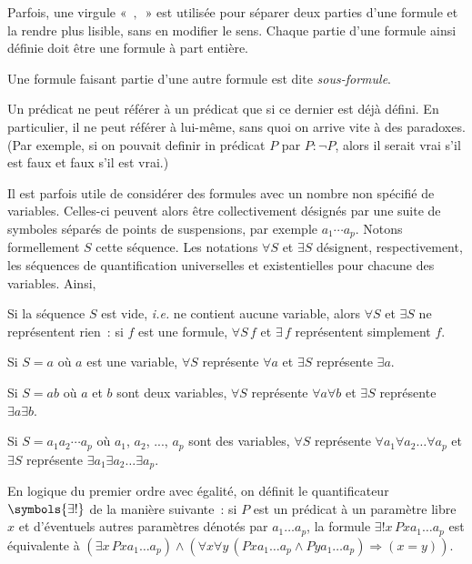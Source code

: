 Parfois, une virgule « $,$ » est utilisée pour séparer deux parties d'une formule et la rendre plus lisible, sans en modifier le sens. 
Chaque partie d'une formule ainsi définie doit être une formule à part entière. 

Une formule faisant partie d'une autre formule est dite \emph{sous-formule}.

\blank[medium]

\noindent{} Un prédicat ne peut référer à un prédicat que si ce dernier est déjà défini. En particulier, il ne peut référer à lui-même, sans quoi on arrive vite à des paradoxes. (Par exemple, si on pouvait definir in prédicat $P$ par $P: \lnot P$, alors il serait vrai s'il est faux et faux s'il est vrai.)

\stopsubsection


\startsubsection[title=Formule à nombre non spécifié de paramètres]

Il est parfois utile de considérer des formules avec un nombre non spécifié de variables. 
Celles-ci peuvent alors être collectivement désignés par une suite de symboles séparés de points de suspensions, par exemple $a_1 \cdots a_p$. 
Notons formellement $S$ cette séquence.
Les notations $\forall S$ et $\exists S$ désignent, respectivement, les séquences de quantification universelles et existentielles pour chacune des variables. 
Ainsi, 
\startitemize[mowhite]
  \item Si la séquence $S$ est vide, \emph{i.e.} ne contient aucune variable, alors $\forall S$ et $\exists S$ ne représentent rien : si $f$ est une formule, $\forall S \, f$ et $\exists \, f$ représentent simplement $f$.
  \item Si $S = a$ où $a$ est une variable, $\forall S$ représente $\forall a$ et $\exists S$ représente $\exists a$. 
  \item Si $S = a b$ où $a$ et $b$ sont deux variables, $\forall S$ représente $\forall a \forall b$ et $\exists S$ représente $\exists a \exists b$. 
  \item Si $S = a_1 a_2 \cdots a_p$ où $a_1$, $a_2$, ..., $a_p$ sont des variables, $\forall S$ représente $\forall a_1 \forall a_2 \dots \forall a_p$ et $\exists S$ représente $\exists a_1 \exists a_2 \dots \exists a_p$. 
\stopitemize

\stopsubsection


\startsubsection[title=Quantificateur d'unicité]

En logique du premier ordre avec égalité, on définit le quantificateur $\symbols{\exists !}$ de la manière suivante : si $P$ est un prédicat à un paramètre libre $x$ et d'éventuels autres paramètres dénotés par $a_1 \dots a_p$, la formule $\exists ! x \, P x a_1 \dots a_p$ est équivalente à $(\exists x \, P x a_1 \dots a_p) \wedge (\forall x \forall y \, (P x a_1 \dots a_p \wedge P y a_1 \dots a_p) \Rightarrow (x=y))$.
    
